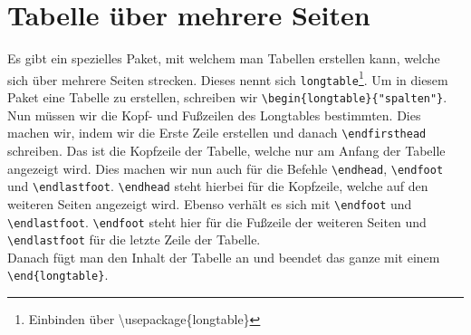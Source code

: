 \documentclass[
12pt,
ngerman
]{scrreprt}
\begin{document}
\section{Tabelle über mehrere Seiten}
\label{sec:longtable}
Es gibt ein spezielles Paket, mit welchem man Tabellen erstellen kann, welche sich über mehrere Seiten strecken. Dieses nennt sich \verb!longtable!\footnote{Einbinden über \textbackslash usepackage\{longtable\}}. Um in diesem Paket eine Tabelle zu erstellen, schreiben wir \verb!\begin{longtable}{"spalten"}!. Nun müssen wir die Kopf- und Fußzeilen des Longtables bestimmten. Dies machen wir, indem wir die Erste Zeile erstellen und danach \verb!\endfirsthead! schreiben. Das ist die Kopfzeile der Tabelle, welche nur am Anfang der Tabelle angezeigt wird. Dies machen wir nun auch für die Befehle \verb!\endhead!, \verb!\endfoot! und \verb!\endlastfoot!. \verb!\endhead! steht hierbei für die Kopfzeile, welche auf den weiteren Seiten angezeigt wird. Ebenso verhält es sich mit \verb!\endfoot! und \verb!\endlastfoot!. \verb!\endfoot! steht hier für die Fußzeile der weiteren Seiten und \verb!\endlastfoot! für die letzte Zeile der Tabelle.\\
Danach fügt man den Inhalt der Tabelle an und beendet das ganze mit einem \verb!\end{longtable}!.
\end{document}
